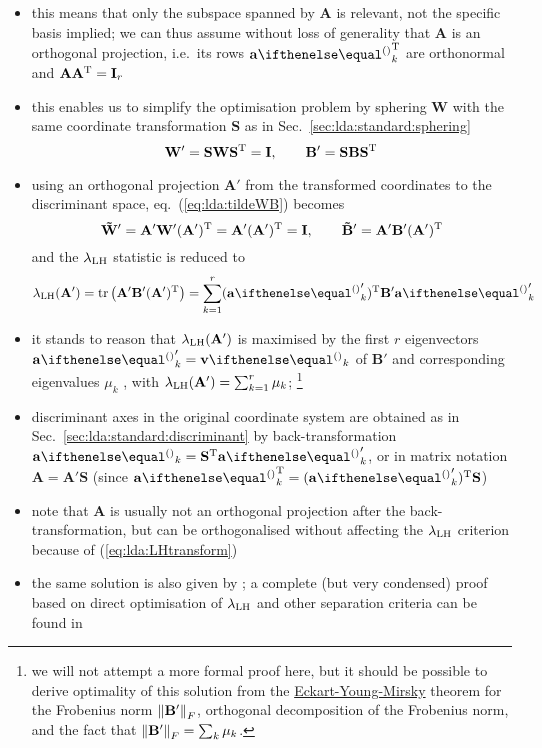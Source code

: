 \documentclass[a4paper]{article}
\begin{document}
\begin{itemize}
 \item this means that only the subspace spanned by $\mathbf{A}$ is relevant, not the specific basis implied; we can thus assume without loss of generality that $\mathbf{A}$ is an orthogonal projection, i.e.\ its rows $\va_k\T$ are orthonormal and $\mathbf{A} \mathbf{A}\T = \mathbf{I}_r$
 \item this enables us to simplify the optimisation problem by sphering $\mathbf{W}$ with the same coordinate transformation $\mathbf{S}$ as in Sec.~\ref{sec:lda:standard:sphering}
   \[
     \mathbf{W}' = \mathbf{S} \mathbf{W} \mathbf{S}\T = \mathbf{I},\qquad
     \mathbf{B}' = \mathbf{S} \mathbf{B} \mathbf{S}\T
   \]
 \item using an orthogonal projection $\mathbf{A}'$ from the transformed coordinates to the discriminant space, eq.~(\ref{eq:lda:tildeWB}) becomes
   \begin{equation}
     \label{eq:lda:tildeWBprime}
     \tmat W' = \mathbf{A}' \mathbf{W}' (\mathbf{A}')\T = \mathbf{A}' (\mathbf{A}')\T = \mathbf{I},\qquad
     \tmat B' = \mathbf{A}' \mathbf{B}' (\mathbf{A}')\T
   \end{equation}
   and the $\llh$ statistic is reduced to
   \begin{equation}
     \label{eq:lda:LHprime}
     \llh(\mathbf{A}') = \Trace{\mathbf{A}' \mathbf{B}' (\mathbf{A}')\T}
     = \sum_{k=1}^r (\va_k')\T \mathbf{B}' \va_k'
   \end{equation}
 \item it stands to reason that $\llh(\mathbf{A}')$ is maximised by the first $r$ eigenvectors $\va_k' = \vv_k$ of $\mathbf{B}'$ and corresponding eigenvalues $\mu_k$ \citep[332]{Venables:Ripley:02}, with $\llh(\mathbf{A}') = \sum_{k=1}^r \mu_k$;%
   \footnote{we will not attempt a more formal proof here, but it should be possible to derive optimality of this solution from the \href{https://en.wikipedia.org/wiki/Low-rank_approximation\#Proof_of_Eckart–Young–Mirsky_theorem_(for_Frobenius_norm)}{Eckart-Young-Mirsky} theorem for the Frobenius norm $\Norm[F]{\mathbf{B}'}$, orthogonal decomposition of the Frobenius norm, and the fact that $\Norm[F]{\mathbf{B}'} = \sum_k \mu_k$.}
 \item discriminant axes in the original coordinate system are obtained as in Sec.~\ref{sec:lda:standard:discriminant} by back-transformation $\va_k = \mathbf{S}\T \va_k'$, or in matrix notation $\mathbf{A} = \mathbf{A}' \mathbf{S}$ (since $\va_k\T = (\va_k')\T \mathbf{S}$)
 \item note that $\mathbf{A}$ is usually not an orthogonal projection after the back-transformation, but can be orthogonalised without affecting the $\llh$ criterion because of (\ref{eq:lda:LHtransform})
 \item the same solution is also given by \citet[192]{Bishop:06}; a complete (but very condensed) proof based on direct optimisation of $\llh$ and other separation criteria can be found in \citep[446--452]{Fukunaga:90}
\end{itemize}
\end{document}
